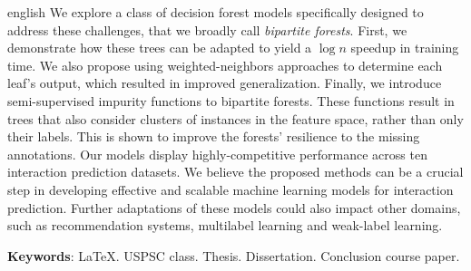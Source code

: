 \begin{resumo}[Abstract]
\begin{otherlanguage*}{english}
	We explore a class of decision forest models specifically designed to address these challenges, that we broadly call \emph{bipartite forests}. First, we demonstrate how these trees can be adapted to yield a $\log n$ speedup in training time. We also propose using weighted-neighbors approaches to determine each leaf's output, which resulted in improved generalization. Finally, we introduce semi-supervised impurity functions to bipartite forests. These functions result in trees that also consider clusters of instances in the feature space, rather than only their labels. This is shown to improve the forests' resilience to the missing annotations.
	Our models display highly-competitive performance across ten interaction prediction datasets.
	We believe the proposed methods can be a crucial step in developing effective and scalable machine learning models for interaction prediction.
	Further adaptations of these models could also impact other domains, such as recommendation systems, multilabel learning and weak-label learning.


   \vspace{\onelineskip}
 
   \noindent 
   \textbf{Keywords}: LaTeX. USPSC class. Thesis. Dissertation. Conclusion course paper. 
 \end{otherlanguage*}
\end{resumo}
